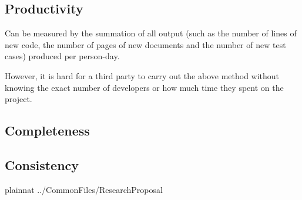 \documentclass{article}
\begin{document}
\subsection{Productivity}
Can be measured by the summation of all output (such as the number of lines of
new code, the number of pages of new documents and the number of new test cases)
produced per person-day.

However, it is hard for a third party to carry out the above method without
knowing the exact number of developers or how much time they spent on the
project.

\subsection{Completeness}

\subsection{Consistency}

\newpage

 {plainnat}
 {../CommonFiles/ResearchProposal}
\end{document}

